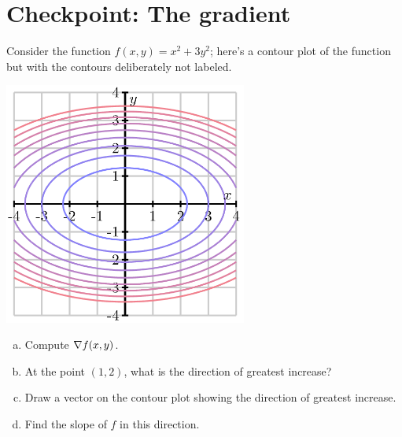 


%


\allowdisplaybreaks
\section{Checkpoint: The gradient }
Consider the function $f(x,y) = x^2 + 3y^2$; here's a contour plot of the function but with the contours deliberately not labeled.

\includegraphics[width=0.6\textwidth]{../images/checkpoint-gradient.png}

\begin{enumerate}[(a)]
    \item Compute $\nabla f(x,y)$.
    \item At the point $(1, 2)$, what is the direction of greatest increase?
    \item Draw a vector on the contour plot showing the direction of greatest increase.
    \item Find the slope of $f$ in this direction.
\end{enumerate}


	
